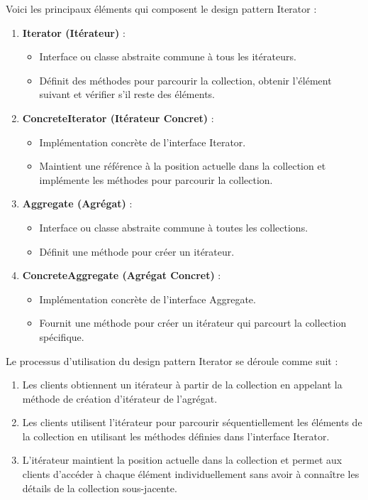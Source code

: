 \documentclass[french]{article}
\begin{document}
Voici les principaux éléments qui composent le design pattern Iterator :

\begin{enumerate}
    \item \textbf{Iterator (Itérateur)} :
    \begin{itemize}
        \item Interface ou classe abstraite commune à tous les itérateurs.
        \item Définit des méthodes pour parcourir la collection, obtenir l'élément suivant et vérifier s'il reste des éléments.
    \end{itemize}
    
    \item \textbf{ConcreteIterator (Itérateur Concret)} :
    \begin{itemize}
        \item Implémentation concrète de l'interface Iterator.
        \item Maintient une référence à la position actuelle dans la collection et implémente les méthodes pour parcourir la collection.
    \end{itemize}
    
    \item \textbf{Aggregate (Agrégat)} :
    \begin{itemize}
        \item Interface ou classe abstraite commune à toutes les collections.
        \item Définit une méthode pour créer un itérateur.
    \end{itemize}
    
    \item \textbf{ConcreteAggregate (Agrégat Concret)} :
    \begin{itemize}
        \item Implémentation concrète de l'interface Aggregate.
        \item Fournit une méthode pour créer un itérateur qui parcourt la collection spécifique.
    \end{itemize}
\end{enumerate}

Le processus d'utilisation du design pattern Iterator se déroule comme suit :

\begin{enumerate}
    \item Les clients obtiennent un itérateur à partir de la collection en appelant la méthode de création d'itérateur de l'agrégat.
    \item Les clients utilisent l'itérateur pour parcourir séquentiellement les éléments de la collection en utilisant les méthodes définies dans l'interface Iterator.
    \item L'itérateur maintient la position actuelle dans la collection et permet aux clients d'accéder à chaque élément individuellement sans avoir à connaître les détails de la collection sous-jacente.
\end{enumerate}
\end{document}
